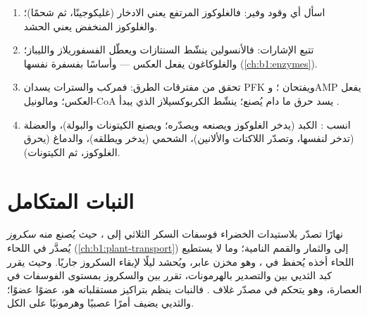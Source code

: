 \begin{method}\label{met:b1:biosyntheses-integration:state}
\begin{enumerate}
  \item اسأل أي وقود وفير: فالغلوكوز المرتفع يعني الادخار
        (غليكوجينًا، ثم شحمًا)؛ والغلوكوز المنخفض يعني الحشد.
  \item تتبع الإشارات: فالأنسولين ينشّط السنتازات ويعطّل الفسفوريلاز
        والليباز؛ والغلوكاغون يفعل العكس --- وأساسًا بفسفرة 
        نفسها (\cref{ch:b1:enzymes}).
  \item تحقق من مفترقات الطرق: فمركب  والسترات يسدان PFK ويفتحان
        ؛ وAMP يفعل العكس؛ ومالونيل-CoA يسد حرق  ما
        دام  يُصنع؛  ينشّط الكربوكسيلاز الذي يبدأ
        .
  \item انسب : الكبد (يدخر الغلوكوز ويصنعه ويصدّره؛ ويصنع
        الكيتونات والبولة)، والعضلة (تدخر  لنفسها، وتصدّر
        اللاكتات والألانين)،  الشحمي (يدخر  ويطلقه)،
        والدماغ (يحرق الغلوكوز، ثم الكيتونات).
\end{enumerate}
\end{method}

\section{النبات المتكامل}

\begin{proposition}\label{prop:b1:biosyntheses-integration:sourcesink}
نهارًا تصدّر بلاستيدات  الخضراء فوسفات السكر الثلاثي إلى
، حيث يُصنع منه \emph{سكروز} يُصدَّر في اللحاء
(\cref{ch:b1:plant-transport}) إلى  والثمار والقمم النامية؛ وما
لا يستطيع اللحاء أخذه يُحفظ في  \emph{}، وهو مخزن عابر،
ويُحشد ليلًا لإبقاء السكروز جاريًا. وحيث يقرر كبد الثديي بين
 والتصدير بالهرمونات، تقرر  بين  والسكروز بمستوى
الفوسفات في العصارة، وهو يتحكم في مصدّر غلاف . فالنبات ينظم
بتراكيز مستقلباته هو، عضوًا عضوًا؛ والثديي يضيف أمرًا عصبيًا وهرمونيًا
على الكل.
\end{proposition}

